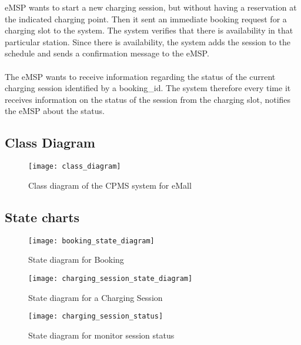 \begin{enumerate}
	eMSP wants to start a new charging session, but without having a reservation at the indicated charging point. Then it sent an immediate booking request for a charging slot to the system. The system verifies that there is availability in that particular station. Since there is availability, the system adds the session to the schedule and sends a confirmation message to the eMSP.\\
	
	
	\\
	The eMSP wants to receive information regarding the status of the current charging session identified by a booking\_id. The system therefore every time it receives information on the status of the session from the charging slot, notifies the eMSP about the status.\\
	
\end{enumerate}

\newpage

\subsection{Class Diagram}

\begin{figure}[h]
\centering
\texttt{[image: class\_diagram]}
\caption{Class diagram of the CPMS system for eMall}
\end{figure}

\clearpage
\newpage

\subsection{State charts}

\begin{figure}[h]
\centering
\texttt{[image: booking\_state\_diagram]}
\caption{State diagram for Booking}
\end{figure}

\begin{figure}[h]
\centering
\texttt{[image: charging\_session\_state\_diagram]}
\caption{State diagram for a Charging Session}
\end{figure}

\begin{figure}[h]
\centering
\texttt{[image: charging\_session\_status]}
\caption{State diagram for monitor session status}
\end{figure}

